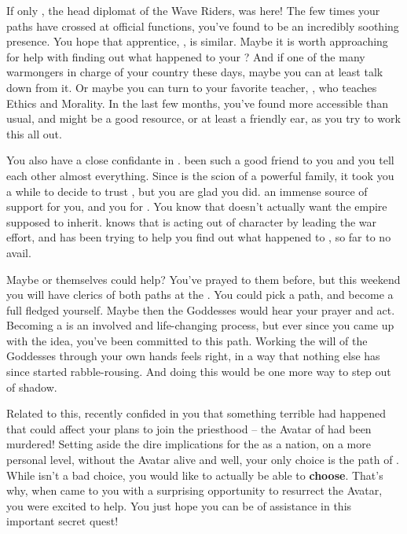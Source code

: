 \documentclass[char]{GL2020}
\begin{document}
If only \cHeadDiplomat{\full}, the head diplomat of the Wave Riders, was here! The few times your paths have crossed at official functions, you've found \cHeadDiplomat{\them} to be an incredibly soothing presence. You hope that \cHeadDiplomat{\their} apprentice, \cJuniorStatesman{\full}, is similar. Maybe it is worth approaching \cJuniorStatesman{\them} for help with finding out what happened to your \cLoud{\parent}? And if \cJuniorStatesman{\theyare} one of the many warmongers in charge of your country these days, maybe you can at least talk \cJuniorStatesman{\them} down from it. Or maybe you can turn to your favorite teacher, \cEthics{\full}, who teaches Ethics and Morality. In the last few months, you've found \cEthics{\them} more accessible than usual, and \cEthics{\they} might be a good resource, or at least a friendly ear, as you try to work this all out.

You also have a close confidante in \cHeir{\full}. \cHeir{\They} \cHeir{\have} been such a good friend to you and you tell each other almost everything. Since \cHeir{} is the scion of a powerful \pTech{} family, it took you a while to decide to trust \cHeir{\them}, but you are glad you did. \cHeir{\Theyare} an immense source of support for you, and you for \cHeir{\them}. You know that \cHeir{} doesn't actually want the empire \cHeir{\theyare} supposed to inherit. \cHeir{} knows that \cLoud{} is acting out of character by leading the war effort, and has been trying to help you find out what happened to \cLoud{\them}, so far to no avail.

Maybe \cEbb{} or \cFlow{} themselves could help? You've prayed to them before, but this weekend you will have clerics of both paths at the \pSc{}. You could pick a path, and become a full fledged \cWarlordDaughter{\cleric} yourself. Maybe then the Goddesses would hear your prayer and act. Becoming a \cWarlordDaughter{\cleric} is an involved and life-changing process, but ever since you came up with the idea, you've been committed to this path. Working the will of the Goddesses through your own hands feels right, in a way that nothing else has since \cLoud{} started rabble-rousing. And doing this would be one more way to step out of \cLoud{\their} shadow.

Related to this, \cFlowPriest{\full} recently confided in you that something terrible had happened that could affect your plans to join the priesthood – the Avatar of \cEbb{} had been murdered! Setting aside the dire implications for the \pShip{} as a nation, on a more personal level, without the \cEbb{} Avatar alive and well, your only choice is the path of \cFlow{}. While \cFlow{} isn't a bad choice, you would like to actually be able to \textbf{choose}. That's why, when \cFlowPriest{} came to you with a surprising opportunity to resurrect the Avatar, you were excited to help. You just hope you can be of assistance in this important secret quest!
\end{document}
